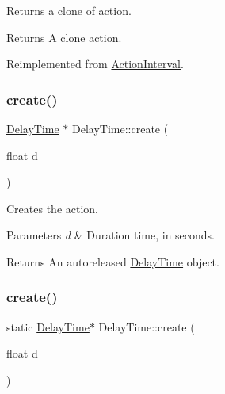 Returns a clone of action.

\begin{DoxyReturn}{Returns}
A clone action. 
\end{DoxyReturn}


Reimplemented from \hyperlink{classActionInterval_abc93ce0c2f54a90eb216a7803f25f44a}{Action\+Interval}.

\mbox{\label{classDelayTime_aedcdc4af223fd14e583f3264b2de0a59}} 
\subsubsection{\texorpdfstring{create()}{create()}\hspace{0.1cm}{\footnotesize\ttfamily [1/2]}}
{\footnotesize\ttfamily \hyperlink{classDelayTime}{Delay\+Time} $\ast$ Delay\+Time\+::create (\begin{DoxyParamCaption}\item[{float}]{d }\end{DoxyParamCaption})\hspace{0.3cm}{\ttfamily [static]}}

Creates the action. 
\begin{DoxyParams}{Parameters}
{\em d} & Duration time, in seconds. \\
\hline
\end{DoxyParams}
\begin{DoxyReturn}{Returns}
An autoreleased \hyperlink{classDelayTime}{Delay\+Time} object. 
\end{DoxyReturn}
\mbox{\label{classDelayTime_a77350fbd83e9bff5dd5257fed010dfbb}} 
\subsubsection{\texorpdfstring{create()}{create()}\hspace{0.1cm}{\footnotesize\ttfamily [2/2]}}
{\footnotesize\ttfamily static \hyperlink{classDelayTime}{Delay\+Time}$\ast$ Delay\+Time\+::create (\begin{DoxyParamCaption}\item[{float}]{d }\end{DoxyParamCaption})\hspace{0.3cm}{\ttfamily [static]}}


